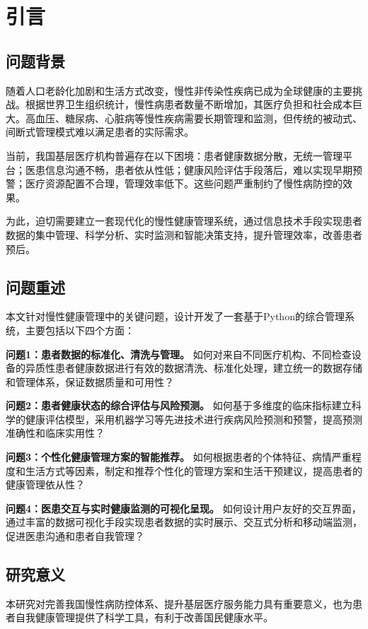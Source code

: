 
\section{引言}

\subsection{问题背景}

随着人口老龄化加剧和生活方式改变，慢性非传染性疾病已成为全球健康的主要挑战。根据世界卫生组织统计，慢性病患者数量不断增加，其医疗负担和社会成本巨大。高血压、糖尿病、心脏病等慢性疾病需要长期管理和监测，但传统的被动式、间断式管理模式难以满足患者的实际需求。

当前，我国基层医疗机构普遍存在以下困境：患者健康数据分散，无统一管理平台；医患信息沟通不畅，患者依从性低；健康风险评估手段落后，难以实现早期预警；医疗资源配置不合理，管理效率低下。这些问题严重制约了慢性病防控的效果。

为此，迫切需要建立一套现代化的慢性健康管理系统，通过信息技术手段实现患者数据的集中管理、科学分析、实时监测和智能决策支持，提升管理效率，改善患者预后。

\subsection{问题重述}

本文针对慢性健康管理中的关键问题，设计开发了一套基于Python的综合管理系统，主要包括以下四个方面：

\textbf{问题1：患者数据的标准化、清洗与管理。} 如何对来自不同医疗机构、不同检查设备的异质性患者健康数据进行有效的数据清洗、标准化处理，建立统一的数据存储和管理体系，保证数据质量和可用性？

\textbf{问题2：患者健康状态的综合评估与风险预测。} 如何基于多维度的临床指标建立科学的健康评估模型，采用机器学习等先进技术进行疾病风险预测和预警，提高预测准确性和临床实用性？

\textbf{问题3：个性化健康管理方案的智能推荐。} 如何根据患者的个体特征、病情严重程度和生活方式等因素，制定和推荐个性化的管理方案和生活干预建议，提高患者的健康管理依从性？

\textbf{问题4：医患交互与实时健康监测的可视化呈现。} 如何设计用户友好的交互界面，通过丰富的数据可视化手段实现患者数据的实时展示、交互式分析和移动端监测，促进医患沟通和患者自我管理？

\subsection{研究意义}

本研究对完善我国慢性病防控体系、提升基层医疗服务能力具有重要意义，也为患者自我健康管理提供了科学工具，有利于改善国民健康水平。

